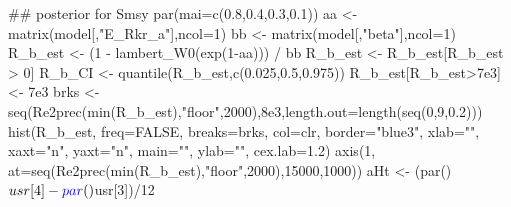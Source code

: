 \documentclass[
  11pt,
]{article}
\newenvironment{Shaded}{}{}
\newcommand{\CommentTok}[1]{\textcolor[rgb]{0.00,0.50,0.00}{#1}}
\newcommand{\DataTypeTok}[1]{#1}
\newcommand{\DecValTok}[1]{#1}
\newcommand{\FloatTok}[1]{#1}
\newcommand{\KeywordTok}[1]{\textcolor[rgb]{0.00,0.00,1.00}{#1}}
\newcommand{\NormalTok}[1]{#1}
\newcommand{\OperatorTok}[1]{#1}
\newcommand{\OtherTok}[1]{\textcolor[rgb]{1.00,0.25,0.00}{#1}}
\newcommand{\StringTok}[1]{\textcolor[rgb]{0.00,0.50,0.50}{#1}}
\begin{document}
\begin{Shaded}
\begin{Highlighting}[]
\CommentTok{## posterior for Smsy}
\KeywordTok{par}\NormalTok{(}\DataTypeTok{mai=}\KeywordTok{c}\NormalTok{(}\FloatTok{0.8}\NormalTok{,}\FloatTok{0.4}\NormalTok{,}\FloatTok{0.3}\NormalTok{,}\FloatTok{0.1}\NormalTok{))}
\NormalTok{aa <-}\StringTok{ }\KeywordTok{matrix}\NormalTok{(model[,}\StringTok{"E_Rkr_a"}\NormalTok{],}\DataTypeTok{ncol=}\DecValTok{1}\NormalTok{)}
\NormalTok{bb <-}\StringTok{ }\KeywordTok{matrix}\NormalTok{(model[,}\StringTok{"beta"}\NormalTok{],}\DataTypeTok{ncol=}\DecValTok{1}\NormalTok{)}
\NormalTok{R_b_est <-}\StringTok{ }\NormalTok{(}\DecValTok{1} \OperatorTok{-}\StringTok{ }\KeywordTok{lambert_W0}\NormalTok{(}\KeywordTok{exp}\NormalTok{(}\DecValTok{1}\OperatorTok{-}\NormalTok{aa))) }\OperatorTok{/}\StringTok{ }\NormalTok{bb}
\NormalTok{R_b_est <-}\StringTok{ }\NormalTok{R_b_est[R_b_est }\OperatorTok{>}\StringTok{ }\DecValTok{0}\NormalTok{]}
\NormalTok{R_b_CI <-}\StringTok{ }\KeywordTok{quantile}\NormalTok{(R_b_est,}\KeywordTok{c}\NormalTok{(}\FloatTok{0.025}\NormalTok{,}\FloatTok{0.5}\NormalTok{,}\FloatTok{0.975}\NormalTok{))}
\NormalTok{R_b_est[R_b_est}\OperatorTok{>}\FloatTok{7e3}\NormalTok{] <-}\StringTok{ }\FloatTok{7e3}
\NormalTok{brks <-}\StringTok{ }\KeywordTok{seq}\NormalTok{(}\KeywordTok{Re2prec}\NormalTok{(}\KeywordTok{min}\NormalTok{(R_b_est),}\StringTok{"floor"}\NormalTok{,}\DecValTok{2000}\NormalTok{),}\FloatTok{8e3}\NormalTok{,}\DataTypeTok{length.out=}\KeywordTok{length}\NormalTok{(}\KeywordTok{seq}\NormalTok{(}\DecValTok{0}\NormalTok{,}\DecValTok{9}\NormalTok{,}\FloatTok{0.2}\NormalTok{)))}
\KeywordTok{hist}\NormalTok{(R_b_est, }\DataTypeTok{freq=}\OtherTok{FALSE}\NormalTok{, }\DataTypeTok{breaks=}\NormalTok{brks, }\DataTypeTok{col=}\NormalTok{clr, }\DataTypeTok{border=}\StringTok{"blue3"}\NormalTok{,}
     \DataTypeTok{xlab=}\StringTok{""}\NormalTok{, }\DataTypeTok{xaxt=}\StringTok{"n"}\NormalTok{, }\DataTypeTok{yaxt=}\StringTok{"n"}\NormalTok{,}
     \DataTypeTok{main=}\StringTok{""}\NormalTok{, }\DataTypeTok{ylab=}\StringTok{""}\NormalTok{, }\DataTypeTok{cex.lab=}\FloatTok{1.2}\NormalTok{)}
\KeywordTok{axis}\NormalTok{(}\DecValTok{1}\NormalTok{, }\DataTypeTok{at=}\KeywordTok{seq}\NormalTok{(}\KeywordTok{Re2prec}\NormalTok{(}\KeywordTok{min}\NormalTok{(R_b_est),}\StringTok{"floor"}\NormalTok{,}\DecValTok{2000}\NormalTok{),}\DecValTok{15000}\NormalTok{,}\DecValTok{1000}\NormalTok{))}
\NormalTok{aHt <-}\StringTok{ }\NormalTok{(}\KeywordTok{par}\NormalTok{()}\OperatorTok{$}\NormalTok{usr[}\DecValTok{4}\NormalTok{]}\OperatorTok{-}\KeywordTok{par}\NormalTok{()}\OperatorTok{$}\NormalTok{usr[}\DecValTok{3}\NormalTok{])}\OperatorTok{/}\DecValTok{12}

\end{Highlighting}
\end{Shaded}
\end{document}
